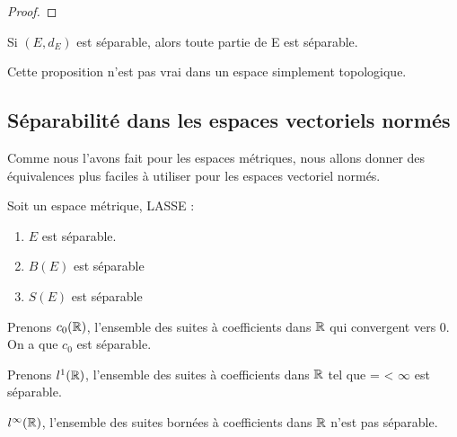 \begin{proof}
	
\end{proof}

\begin{proposition}
	Si $(E, d_{E})$ est séparable, alors toute partie de E est séparable.
\end{proposition}

\begin{remarque}
	Cette proposition n'est pas vrai dans un espace simplement topologique.
\end{remarque}

\subsection{Séparabilité dans les espaces vectoriels normés}

Comme nous l'avons fait pour les espaces métriques, nous allons donner des
équivalences plus faciles à utiliser pour les espaces vectoriel normés.

\begin{proposition}
	Soit  un espace métrique, LASSE :
	\begin{enumerate}
		\item $E$ est séparable.
		\item $B(E)$ est séparable
		\item $S(E)$ est séparable
	\end{enumerate}
\end{proposition}

\begin{exemple}
	Prenons $c_{0}(\mathbb{R})$, l'ensemble des suites à coefficients dans $\mathbb{R}$
	qui convergent vers 0. On a que $c_{0}$ est séparable.
\end{exemple}

\begin{exemple}
	Prenons $l^{1}(\mathbb{R})$, l'ensemble des suites à coefficients dans $\mathbb{R}$
	tel que  =  < $\infty$ est
	séparable.
\end{exemple}

\begin{exemple}
	$l^{\infty}(\mathbb{R})$, l'ensemble des suites bornées à coefficients dans
	$\mathbb{R}$ n'est pas séparable.
\end{exemple}

